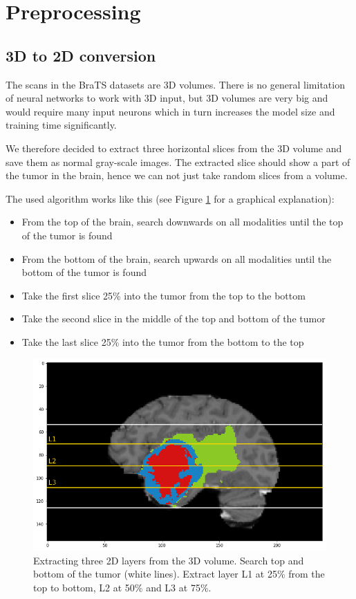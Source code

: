 \section{Preprocessing}
\subsection{3D to 2D conversion}
The scans in the BraTS datasets are 3D volumes. There is no general limitation of neural networks to work with 3D input, but 3D volumes are very big and would require many input neurons which in turn increases the model size and training time significantly.

We therefore decided to extract three horizontal slices from the 3D volume and save them as normal gray-scale images.
The extracted slice should show a part of the tumor in the brain, hence we can not just take random slices from a volume.

The used algorithm works like this (see Figure \ref{preprocessing_layers} for a graphical explanation):

\begin{itemize}
    \item From the top of the brain, search downwards on all modalities until the top of the tumor is found
    \item From the bottom of the brain, search upwards on all modalities until the bottom of the tumor is found
    \item Take the first slice 25\% into the tumor from the top to the bottom
    \item Take the second slice in the middle of the top and bottom of the tumor
    \item Take the last slice 25\% into the tumor from the bottom to the top
\end{itemize}

\begin{figure}[H]
    \centering
    \includegraphics[width=14cm]{chapters/04_segmentation/images/slicing.png}
    \caption{Extracting three 2D layers from the 3D volume. Search top and bottom of the tumor (white lines). Extract layer L1 at 25\% from the top to bottom, L2 at 50\% and L3 at 75\%.}
    \label{preprocessing_layers}
\end{figure}


